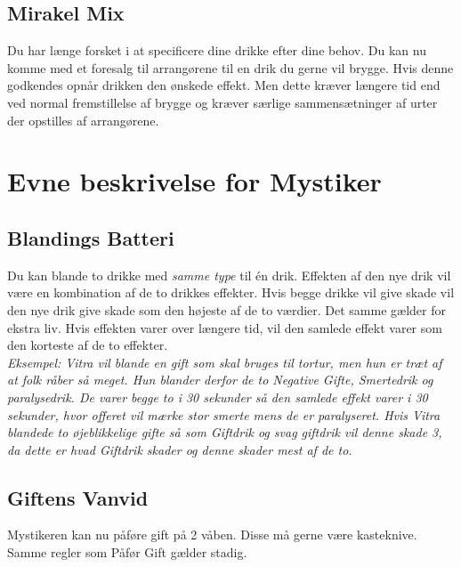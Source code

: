 

\subsection*{Mirakel Mix}
Du har længe forsket i at specificere dine drikke efter dine behov. Du kan nu komme med et foresalg til arrangørene til en drik du gerne vil brygge. Hvis denne godkendes opnår drikken den ønskede effekt. Men dette kræver længere tid end ved normal fremstillelse af brygge og kræver særlige sammensætninger af urter der opstilles af arrangørene.\\


\section*{Evne beskrivelse for Mystiker}

\subsection*{Blandings Batteri}
Du kan blande to drikke med \emph{samme type} til én drik. Effekten af den nye drik vil være en kombination af de to drikkes effekter. Hvis begge drikke vil give skade vil den nye drik give skade som den højeste af de to værdier. Det samme gælder for ekstra liv. Hvis effekten varer over længere tid, vil den samlede effekt varer som den korteste af de to effekter.\\
\textit{Eksempel: Vitra vil blande en gift som skal bruges til tortur, men hun er træt af at folk råber så meget. Hun blander derfor de to Negative Gifte, Smertedrik og paralysedrik. De varer begge to i 30 sekunder så den samlede effekt varer i 30 sekunder, hvor offeret vil mærke stor smerte mens de er paralyseret. Hvis Vitra blandede to øjeblikkelige gifte så som Giftdrik og svag giftdrik vil denne skade 3, da dette er hvad Giftdrik skader og denne skader mest af de to.}

\subsection*{Giftens Vanvid}
Mystikeren kan nu påføre gift på 2 våben. Disse må gerne være kasteknive. Samme regler som Påfør Gift gælder stadig.\\

